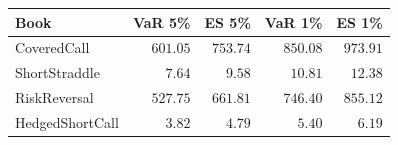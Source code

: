 \begin{tabular}{lrrrr}
\toprule
Book & VaR 5\% & ES 5\% & VaR 1\% & ES 1\% \\
\midrule
CoveredCall & $601.05$ & $753.74$ & $850.08$ & $973.91$ \\
ShortStraddle & $7.64$ & $9.58$ & $10.81$ & $12.38$ \\
RiskReversal & $527.75$ & $661.81$ & $746.40$ & $855.12$ \\
HedgedShortCall & $3.82$ & $4.79$ & $5.40$ & $6.19$ \\
\bottomrule
\end{tabular}

